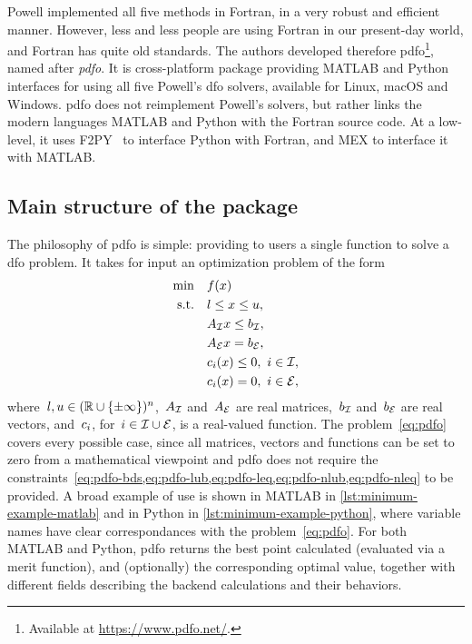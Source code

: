 Powell implemented all five methods in Fortran, in a very robust and efficient manner.
However, less and less people are using Fortran in our present-day world, and Fortran has quite old standards.
The authors developed therefore \gls{pdfo}\footnote{Available at \url{https://www.pdfo.net/}.}, named after \emph{\glsdesc{pdfo}}.
It is cross-platform package providing MATLAB and Python interfaces for using all five Powell's \gls{dfo} solvers, available for Linux, macOS and Windows.
\Gls{pdfo} does not reimplement Powell's solvers, but rather links the modern languages MATLAB and Python with the Fortran source code.
At a low-level, it uses F2PY~\cite{Peterson_2009} to interface Python with Fortran, and MEX to interface it with MATLAB.

\subsection{Main structure of the package}

The philosophy of \gls{pdfo} is simple: providing to users a single function to solve a \gls{dfo} problem.
It takes for input an optimization problem of the form
\begin{subequations}
    \label{eq:pdfo}
    \begin{align}
        \min        & \quad \obj(\iter)\\
        \text{s.t.} & \quad \xl \le \iter \le \xu, \label{eq:pdfo-bds}\\
                    & \quad A_{\iub} \iter \le b _{\iub}, \label{eq:pdfo-lub}\\
                    & \quad A_{\ieq} \iter = b_{\ieq}, \label{eq:pdfo-leq}\\
                    & \quad \con{i}(\iter) \le 0, ~ i \in \iub, \label{eq:pdfo-nlub}\\
                    & \quad \con{i}(\iter) = 0, ~ i \in \ieq, \label{eq:pdfo-nleq}\\
    \end{align}
\end{subequations}
where~$l, u \in (\mathbb{R} \cup \{\pm \infty\})^n$,~$A_{\mathcal{I}}$ and~$A_{\mathcal{E}}$ are real matrices,~$b _{\mathcal{I}}$ and~$b _{\mathcal{E}}$ are real vectors, and~$c_{i}$, for~$i \in \mathcal{I} \cup \mathcal{E}$, is a real-valued function.
The problem~\cref{eq:pdfo} covers every possible case, since all matrices, vectors and functions can be set to zero from a mathematical viewpoint and \gls{pdfo} does not require the constraints~\cref{eq:pdfo-bds,eq:pdfo-lub,eq:pdfo-leq,eq:pdfo-nlub,eq:pdfo-nleq} to be provided.
A broad example of use is shown in MATLAB in \cref{lst:minimum-example-matlab} and in Python in \cref{lst:minimum-example-python}, where variable names have clear correspondances with the problem~\cref{eq:pdfo}.
For both MATLAB and Python, \gls{pdfo} returns the best point calculated (evaluated via a merit function), and (optionally) the corresponding optimal value, together with different fields describing the backend calculations and their behaviors.


